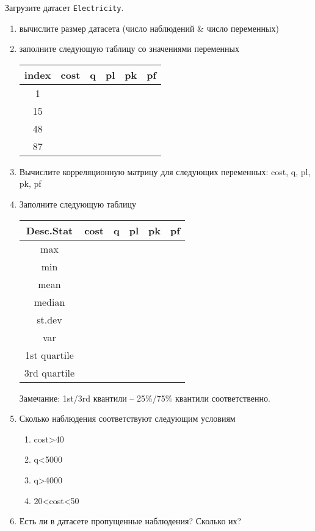 \begin{exercise}
Загрузите датасет \texttt{Electricity}.
\begin{enumerate}
	\item вычислите размер датасета (число наблюдений \& число переменных)
	\item заполните следующую таблицу со значениями переменных
	\begin{center}
		\begin{tabular}{|c|c|c|c|c|c|} \hline
			index & cost & q & pl & pk & pf \\ \hline\hline
			1 & & & & & \\ \hline
			15 & & & &  & \\ \hline
			48 & & & & & \\ \hline
			87 & & & & & \\ \hline
		\end{tabular}
	\end{center}
	\item Вычислите корреляционную матрицу для следующих переменных: cost, q, pl, pk, pf 
	\item Заполните следующую таблицу
	\begin{center}
		\begin{tabular}{|c|c|c|c|c|c|} \hline
			Desc.Stat & cost & q & pl & pk & pf\\ \hline\hline
			max & & & & & \\ \hline
			min & & & & & \\ \hline
			mean & & & &  & \\ \hline
			median & & & & & \\ \hline
			st.dev & & & & & \\ \hline
			var & & & & & \\ \hline
			1st quartile & & & & & \\ \hline
			3rd quartile & & & & & \\ \hline
		\end{tabular}
	\end{center}
	Замечание: 1st/3rd квантили -- 25\%/75\% квантили соответственно.
	\item Сколько наблюдения соответствуют следующим условиям
		\begin{enumerate}
			\item cost>40
			\item q<5000
			\item q>4000
			\item 20<cost<50
		\end{enumerate}
	\item Есть ли в датасете пропущенные наблюдения?
	Сколько их?
\end{enumerate}
\end{exercise}

